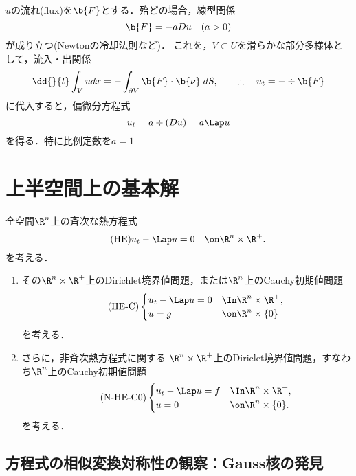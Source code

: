 \documentclass[uplatex,dvipdfmx]{jsreport}
\begin{document}
\begin{observation}[熱方程式の発生]
    $u$の流れ(flux)を$\b{F}$とする．殆どの場合，線型関係
    \[\b{F}=-aDu\quad(a>0)\]
    が成り立つ(Newtonの冷却法則など)．
    これを，$V\subset U$を滑らかな部分多様体として，流入・出関係
    \[\dd{}{t}\int_Vudx=-\int_{\partial V}\b{F}\cdot\b{\nu}\;dS,\qquad\therefore\quad u_t=-\div\b{F}\]
    に代入すると，偏微分方程式
    \[u_t=a\div(Du)=a\Lap u\]
    を得る．特に比例定数を$a=1$
\end{observation}

\section{上半空間上の基本解}

\begin{problem}
    全空間$\R^n$上の斉次な熱方程式
    \begin{equation}\label{HE}\tag{HE}
        u_t-\Lap u=0\quad\on\R^n\times\R^+.
    \end{equation}
    を考える．
    \begin{enumerate}
        \item その$\R^n\times\R^+$上のDirichlet境界値問題，または$\R^n$上のCauchy初期値問題
        \begin{equation}\label{HE-C}\tag{HE-C}
            \begin{cases}
                u_t-\Lap u=0&\In\R^n\times\R^+,\\
                u=g&\on\R^n\times\{0\}
            \end{cases}
        \end{equation}
        を考える．
        \item さらに，非斉次熱方程式に関する
        $\R^n\times\R^+$上のDiriclet境界値問題，すなわち$\R^n$上のCauchy初期値問題
        \begin{equation}\label{N-HE-C}\tag{N-HE-C0}
            \begin{cases}
                u_t-\Lap u=f&\In\R^n\times\R^+,\\
                u=0&\on\R^n\times\{0\}.
            \end{cases}
        \end{equation}
        を考える．
    \end{enumerate}
\end{problem}

\subsection{方程式の相似変換対称性の観察：Gauss核の発見}
\end{document}
